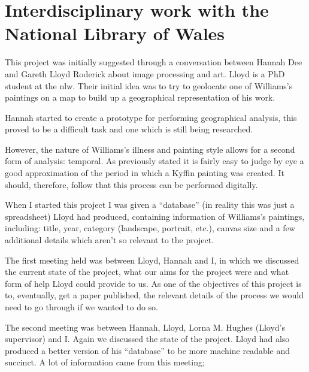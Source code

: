 \section{Interdisciplinary work with the National Library of Wales}

This project was initially suggested through a conversation between Hannah Dee and Gareth Lloyd
Roderick about image processing and art. Lloyd is a PhD student at the \gls{nlw}.
Their initial idea was to try to geolocate one of Williams's paintings on a map to build up a geographical 
representation of his work.

Hannah started to create a prototype for performing geographical analysis, this proved to be a 
difficult task and one which is still being researched.

However, the nature of Williams's illness and painting style allows for a second form of analysis:
temporal. As previously stated it is fairly easy to judge by eye a good approximation of the 
period in which a Kyffin painting was created. It should, therefore, follow that this process can
be performed digitally.

When I started this project I was given a ``database'' (in reality this was just a spreadsheet) 
Lloyd had produced, containing information of Williams's paintings, including: title, year,
category (landscape, portrait, etc.), canvas size and a few additional details which aren't so 
relevant to the project.

The first meeting held was between Lloyd, Hannah and I, in which we discussed the current state of
the project, what our aims for the project were and what form of help Lloyd could provide to us.
As one of the objectives of this project is to, eventually, get a paper published, the relevant
details of the process we would need to go through if we wanted to do so.

The second meeting was between Hannah, Lloyd, Lorna M. Hughes (Lloyd's supervisor) and I. Again we
discussed the state of the project. Lloyd had also produced a better version of his ``database'' 
to be more machine readable and succinct. A lot of information came from this meeting;

